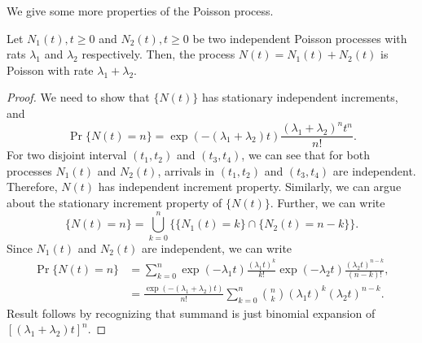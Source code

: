 \documentclass[a4paper,10pt]{article}
\begin{document}
We give some more properties of the Poisson process.
\begin{thm} Let ${N_1(t), t \geqslant  0}$ and ${N_2(t), t \geqslant  0}$ be two independent Poisson processes with rats $\lambda_{1}$ and $\lambda_{2}$ respectively. Then, the process $N(t)= N_{1}(t) +N_{2}(t)$ is Poisson with rate $\lambda_{1}+\lambda_{2}$.
\end{thm}
\begin{proof} We need to show that $\{N(t)\}$ has stationary independent increments, and 
\begin{equation*}
	\Pr\{N(t)=n\}=   \exp(-(\lambda_{1}+\lambda_{2})t)\frac{(\lambda_{1}+\lambda_{2})^n t^n}{n!}.
\end{equation*}
For two disjoint interval $(t_{1}, t_{2})$ and $(t_3,t_4)$, we can see that for both processes $N_{1}(t)$ and $N_2(t)$,  arrivals in $(t_{1}, t_{2})$ and $(t_3,t_{4})$ are independent. Therefore, $N(t)$ has independent increment property. Similarly, we can argue about the stationary increment property of $\{N(t)\}$. Further, we can write 
\begin{equation*}
	\{N(t)=n\} = \bigcup_{k=0}^n\{\{N_1(t) = k\}\cap\{N_2(t) = n-k\}\}.
\end{equation*}
Since $N_1(t)$ and $N_2(t)$ are independent, we can write
\begin{align*}
	\Pr\{N(t)=n\} &= \sum_{k=0}^n\exp(-\lambda_1t)\frac{(\lambda_1t)^k}{k!}\exp(-\lambda_2t)\frac{(\lambda_2t)^{n-k}}{(n-k)!},\\
	&= \frac{\exp(-(\lambda_1+\lambda_2)t)}{n!}\sum_{k=0}^n\binom{n}{k}(\lambda_1t)^k(\lambda_2t)^{n-k}.%
\end{align*}
Result follows by recognizing that summand is just binomial expansion of $[(\lambda_1 + \lambda_2)t]^n$.
\end{proof}
\end{document}
